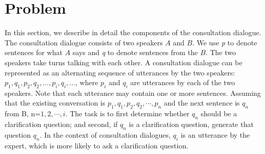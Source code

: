 \section{Problem}
\label{problem}

In this section, we describe in detail the components of the consultation 
dialogue. The consultation dialogue consists of two speakers $A$ and $B$. 
We use \emph{p} to denote sentences for what $A$ says and \emph{q} to 
denote sentences from the $B$. The two speakers take turns talking with 
each other. A consultation dialogue can be represented as an alternating 
sequence of utterances by the two speakers:  
$p_{1}, q_{1}, p_{2}, q_{2}, \ldots, p_{i}, q_{i}, ...$, 
where $p_i$ and $q_i$ are utterances
by each of the two speakers. Note that each utterance may contain one or more sentences. Assuming that the existing conversation is $p_{1}, q_{1}, p_{2}, q_{2}, \cdots, p_{n}$ and the next sentence is $q_{n}$ from B, n=$1, 2, \cdots, i$.  The task is to first determine whether $q_{n}$ should be
a clarification question; and second, if $q_{n}$ is a clarification question, 
generate that question $q_{n}$. In the context of consultation dialogues,
$q_i$ is an utterance by the expert, which is more likely to ask a 
clarification question.
